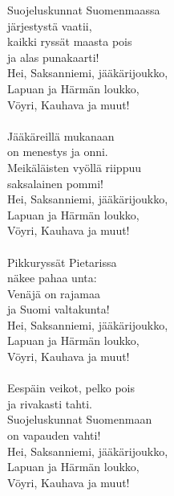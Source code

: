 
            Suojeluskunnat Suomenmaassa \\
            järjestystä vaatii, \\
            kaikki ryssät maasta pois \\
            ja alas punakaarti! \\
            Hei, Saksanniemi, jääkärijoukko, \\
            Lapuan ja Härmän loukko, \\
            Vöyri, Kauhava ja muut! \\
\hspace{10mm} \\
            Jääkäreillä mukanaan \\
            on menestys ja onni. \\
            Meikäläisten vyöllä riippuu \\
            saksalainen pommi! \\
            Hei, Saksanniemi, jääkärijoukko, \\
            Lapuan ja Härmän loukko, \\
            Vöyri, Kauhava ja muut! \\
\hspace{10mm} \\
            Pikkuryssät Pietarissa \\
            näkee pahaa unta: \\
            Venäjä on rajamaa \\
            ja Suomi valtakunta! \\
            Hei, Saksanniemi, jääkärijoukko, \\
            Lapuan ja Härmän loukko, \\
            Vöyri, Kauhava ja muut! \\
\hspace{10mm} \\
            Eespäin veikot, pelko pois \\
            ja rivakasti tahti. \\
            Suojeluskunnat Suomenmaan \\
            on vapauden vahti! \\
            Hei, Saksanniemi, jääkärijoukko, \\
            Lapuan ja Härmän loukko, \\
            Vöyri, Kauhava ja muut! \\

